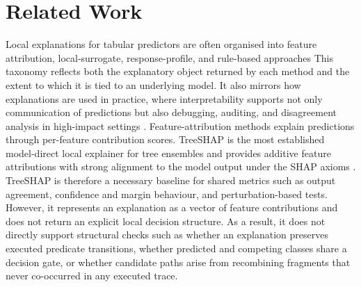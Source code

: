 \documentclass[runningheads]{llncs}
\begin{document}
\section{Related Work}\label{sec:relWork}
Local explanations for tabular predictors are often organised into feature attribution, local-surrogate, response-profile, and rule-based approaches \cite{molnar2019iml,adadi2018peeking} %
This taxonomy reflects both the explanatory object returned by each method and the extent to which it is tied to an underlying model. It also mirrors how explanations are used in practice, where interpretability supports not only communication of predictions but also debugging, auditing, and disagreement analysis in high-impact settings \cite{arrieta2020explainable,doshi2017rigorous}.
Feature-attribution methods explain predictions through per-feature contribution scores. TreeSHAP is the most established model-direct local explainer for tree ensembles and provides additive feature attributions with strong alignment to the model output under the SHAP axioms \cite{lundberg2017unified,lundberg2018consistent}. TreeSHAP is therefore a necessary baseline for shared metrics such as output agreement, confidence and margin behaviour, and perturbation-based tests. However, it represents an explanation as a vector of feature contributions and does not return an explicit local decision structure. As a result, it does not directly support structural checks such as whether an explanation preserves executed predicate transitions, whether predicted and competing classes share a decision gate, or whether candidate paths arise from recombining fragments that never co-occurred in any executed trace.
\end{document}

